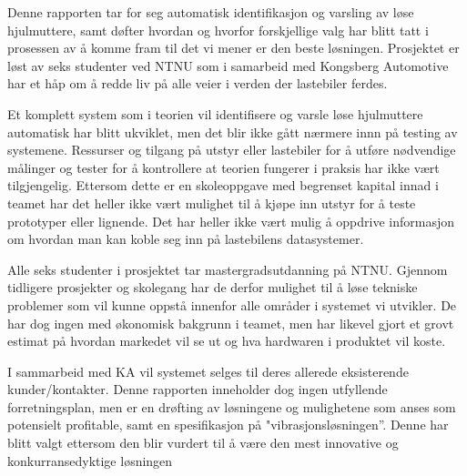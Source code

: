 Denne rapporten tar for seg automatisk identifikasjon og varsling av løse hjulmuttere, samt døfter hvordan og hvorfor forskjellige
valg har blitt tatt i prosessen av å komme fram til det vi mener er den beste løsningen. Prosjektet er løst av seks studenter ved NTNU
som i samarbeid med Kongsberg Automotive har et håp om å redde liv på alle veier i verden der lastebiler ferdes. 

Et komplett system som i teorien vil identifisere og varsle løse hjulmuttere automatisk har blitt ukviklet, men det blir ikke
gått nærmere innn på testing av systemene. Ressurser og tilgang på utstyr eller lastebiler for å utføre 
nødvendige målinger og tester for å kontrollere at teorien fungerer i praksis har ikke vært tilgjengelig. Ettersom dette er en skoleoppgave med begrenset
kapital innad i teamet har det heller ikke vært mulighet til å kjøpe inn utstyr for å teste prototyper eller lignende. Det har heller ikke 
vært mulig å oppdrive informasjon om hvordan man kan koble seg inn på lastebilens datasystemer.

Alle seks studenter i prosjektet tar mastergradsutdanning på NTNU. Gjennom tidligere prosjekter og skolegang har de derfor
mulighet til å løse tekniske problemer som vil kunne oppstå innenfor alle områder i systemet vi utvikler. De har dog ingen med
økonomisk bakgrunn i teamet, men har likevel gjort et grovt estimat på hvordan markedet vil se ut og hva hardwaren i produktet
vil koste.

I sammarbeid med KA vil systemet selges til deres allerede eksisterende kunder/kontakter. Denne rapporten
inneholder dog ingen utfyllende forretningsplan, men er en drøfting av løsningene og mulighetene som anses som
potensielt profitable, samt en spesifikasjon på "vibrasjonsløsningen''. Denne har blitt valgt ettersom den blir vurdert
til å være den mest innovative og konkurransedyktige løsningen